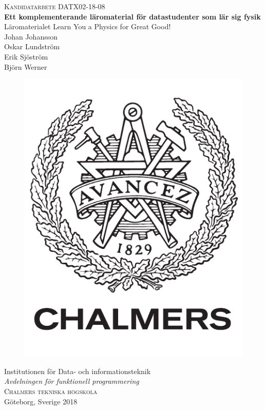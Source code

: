 \newpage
\restoregeometry
\thispagestyle{empty}
\mbox{}


\newpage
\thispagestyle{empty}
\begin{center}
	\textsc{\large Kandidatarbete DATX02-18-08}\\[4cm]		%
	\textbf{\Large Ett komplementerande läromaterial för datastudenter som lär sig fysik} \\[1cm]
	{\large Läromaterialet Learn You a Physics for Great Good!}\\[1cm]
	{\large Johan Johansson}\\
  {\large Oskar Lundström}\\
 	{\large Erik Sjöström}\\
  {\large Björn Werner}\\

	\vfill
	\begin{figure}[H]
	\centering
	\includegraphics[width=0.2\pdfpagewidth]{figure/auxiliary/logo_swe.pdf} \\
	\end{figure}	\vspace{5mm}

	Institutionen för Data- och informationsteknik \\
	\emph{Avdelningen för funktionell programmering}\\
	\textsc{Chalmers tekniska högskola} \\
	Göteborg, Sverige 2018 \\
\end{center}


